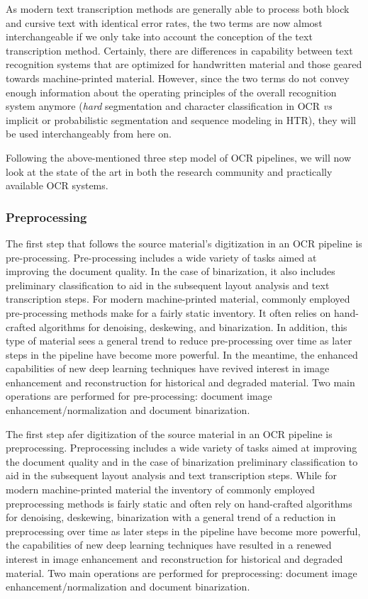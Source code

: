 As modern text transcription methods are generally able to process both block
and cursive text with identical error rates, the two terms are now almost
interchangeable if we only take into account the conception of the text
transcription method. Certainly, there are differences in capability between
text recognition systems that are optimized for handwritten material and those
geared towards machine-printed material. However, since the two terms do not
convey enough information about the operating principles of the overall
recognition system anymore (\emph{hard} segmentation and character
classification in OCR \emph{vs} implicit or probabilistic segmentation and
sequence modeling in HTR), they will be used interchangeably from here on.

Following the above-mentioned three step model of OCR pipelines, we will now
look at the state of the art in both the research community and practically
available OCR systems.

\subsubsection{Preprocessing}

The first step that follows the source material’s digitization in an OCR
pipeline is pre-processing. Pre-processing includes a wide variety of tasks
aimed at improving the document quality. In the case of binarization, it also
includes preliminary classification to aid in the subsequent layout analysis
and text transcription steps. For modern machine-printed material, commonly
employed pre-processing methods make for a fairly static inventory. It often
relies on hand-crafted algorithms for denoising, deskewing, and binarization.
In addition, this type of material sees a general trend to reduce
pre-processing over time as later steps in the pipeline have become more
powerful. In the meantime, the enhanced capabilities of new deep learning
techniques have revived interest in image enhancement and reconstruction for
historical and degraded material. Two main operations are performed for
pre-processing: document image enhancement/normalization and document
binarization.


The first step afer digitization of the source material in an OCR pipeline is
preprocessing. Preprocessing includes a wide variety of tasks aimed at
improving the document quality and in the case of binarization preliminary
classification to aid in the subsequent layout analysis and text transcription
steps. While for modern machine-printed material the inventory of commonly
employed preprocessing methods is fairly static and often rely on hand-crafted
algorithms for denoising, deskewing, binarization with a general trend of a
reduction in preprocessing over time as later steps in the pipeline have become
more powerful, the capabilities of new deep learning techniques have resulted
in a renewed interest in image enhancement and reconstruction for historical
and degraded material. Two main operations are performed for preprocessing:
document image enhancement/normalization and document binarization.

